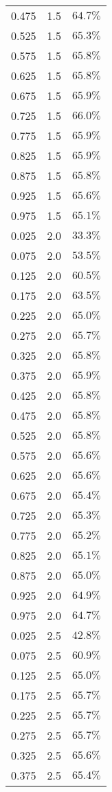 \begin{longtable}{rrr}
0.475 & 1.5 & $64.7\%$ \\ 
0.525 & 1.5 & $65.3\%$ \\ 
0.575 & 1.5 & $65.8\%$ \\ 
0.625 & 1.5 & $65.8\%$ \\ 
0.675 & 1.5 & $65.9\%$ \\ 
0.725 & 1.5 & $66.0\%$ \\ 
0.775 & 1.5 & $65.9\%$ \\ 
0.825 & 1.5 & $65.9\%$ \\ 
0.875 & 1.5 & $65.8\%$ \\ 
0.925 & 1.5 & $65.6\%$ \\ 
0.975 & 1.5 & $65.1\%$ \\ 
0.025 & 2.0 & $33.3\%$ \\ 
0.075 & 2.0 & $53.5\%$ \\ 
0.125 & 2.0 & $60.5\%$ \\ 
0.175 & 2.0 & $63.5\%$ \\ 
0.225 & 2.0 & $65.0\%$ \\ 
0.275 & 2.0 & $65.7\%$ \\ 
0.325 & 2.0 & $65.8\%$ \\ 
0.375 & 2.0 & $65.9\%$ \\ 
0.425 & 2.0 & $65.8\%$ \\ 
0.475 & 2.0 & $65.8\%$ \\ 
0.525 & 2.0 & $65.8\%$ \\ 
0.575 & 2.0 & $65.6\%$ \\ 
0.625 & 2.0 & $65.6\%$ \\ 
0.675 & 2.0 & $65.4\%$ \\ 
0.725 & 2.0 & $65.3\%$ \\ 
0.775 & 2.0 & $65.2\%$ \\ 
0.825 & 2.0 & $65.1\%$ \\ 
0.875 & 2.0 & $65.0\%$ \\ 
0.925 & 2.0 & $64.9\%$ \\ 
0.975 & 2.0 & $64.7\%$ \\ 
0.025 & 2.5 & $42.8\%$ \\ 
0.075 & 2.5 & $60.9\%$ \\ 
0.125 & 2.5 & $65.0\%$ \\ 
0.175 & 2.5 & $65.7\%$ \\ 
0.225 & 2.5 & $65.7\%$ \\ 
0.275 & 2.5 & $65.7\%$ \\ 
0.325 & 2.5 & $65.6\%$ \\ 
0.375 & 2.5 & $65.4\%$ \\ 

\end{longtable}
